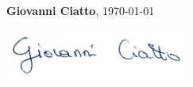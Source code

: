 \documentclass{resume} %
\begin{document}
\begin{flushright}
	\textbf{Giovanni Ciatto}, \today
	
	\includegraphics[width=6cm]{./signature.png}
\end{flushright}
\end{document}
